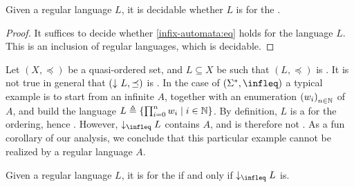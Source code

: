 \begin{corollary}
    \label{reg-wqo-decidable:cor}
    Given a regular language $L$, it is decidable whether
    $L$ is  for the .
\end{corollary}
\begin{proof}
    It suffices to decide whether 
    \cref{infix-automata:eq} holds for the language $L$.
    This is an inclusion of regular languages, which is decidable.
\end{proof}


Let $(X,\preceq)$ be a quasi-ordered set, and $L \subseteq X$ be such that $(L,
\preceq)$ is . It is not true in general that
$(\dwset{L}, \preceq)$ is . In the case of $(\Sigma^*,
\infleq)$ a typical example is to start from an infinite  $A$,
together with an enumeration $\seqof{w_i}$ of $A$, and build the language $L
\triangleq \{  \prod_{i = 0}^n w_i  \mid  i \in \mathbb{N}  \}$. By definition, $L$ is a
 for the  ordering, hence . However,
$\dwset[\infleq]{L}$ contains $A$, and is therefore not
. As a fun corollary of our analysis, we conclude that
this particular example cannot be realized by a regular language $A$.

\begin{corollary}
    \label{reg-wqo-iff-dwclosed-wqo:cor}
    Given a regular language $L$, it is  
    for the  if and only if 
    $\dwset[\infleq] L$ is.
\end{corollary}
